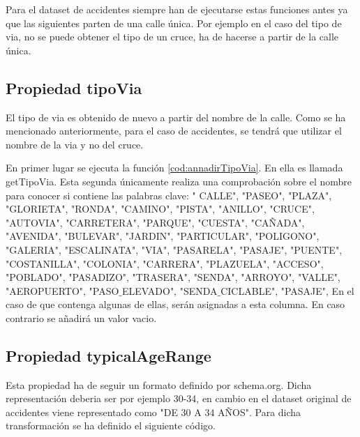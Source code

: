 



Para el dataset de accidentes siempre han de ejecutarse estas funciones antes ya que las siguientes parten de una calle única. Por ejemplo en el caso del tipo de via, no se puede obtener el tipo de un cruce, ha de hacerse a partir de la calle única.



\clearpage
\subsection{Propiedad tipoVia}

El tipo de via es obtenido de nuevo a partir del nombre de la calle. Como se ha mencionado anteriormente, para el caso de accidentes, se tendrá que utilizar el nombre de la via y no del cruce.



En primer lugar se ejecuta la función \ref{cod:annadirTipoVia}. En ella es llamada getTipoVia. Esta segunda únicamente realiza una comprobación sobre el nombre para conocer si contiene las palabras clave: " CALLE", "PASEO", "PLAZA", "GLORIETA", "RONDA", "CAMINO", "PISTA", "ANILLO", "CRUCE", "AUTOVIA", "CARRETERA", "PARQUE", "CUESTA", "CAÑADA", "AVENIDA", "BULEVAR", "JARDIN", "PARTICULAR", "POLIGONO", "GALERIA", "ESCALINATA", "VIA", "PASARELA", "PASAJE", "PUENTE", "COSTANILLA", "COLONIA", "CARRERA", "PLAZUELA", "ACCESO", "POBLADO", "PASADIZO", "TRASERA", "SENDA", "ARROYO", "VALLE", "AEROPUERTO", "PASO$\_$ELEVADO", "SENDA$\_$CICLABLE", "PASAJE",  En el caso de que contenga algunas de ellas, serán asignadas a esta columna. En caso contrario se añadirá un valor vacio.

\clearpage
\subsection{Propiedad typicalAgeRange}

Esta propiedad ha de seguir un formato definido por schema.org. Dicha representación deberia ser por ejemplo 30-34, en cambio en el dataset original de accidentes viene representado como "DE 30 A 34 AÑOS". Para dicha transformación se ha definido el siguiente código.

